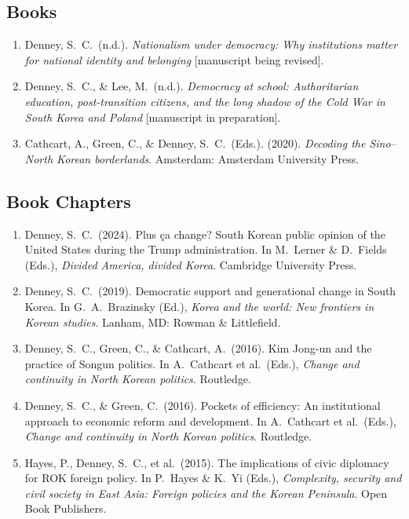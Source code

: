 \documentclass[11pt, a4paper]{article}
\begin{document}
\subsection{Books}

\begin{enumerate}[itemsep=0.15em]
  \item Denney, S.\ C.\ (n.d.). \textit{Nationalism under democracy: Why institutions matter for national identity and belonging} [manuscript being revised].

  \item Denney, S.\ C., \& Lee, M.\ (n.d.). \textit{Democracy at school: Authoritarian education, post-transition citizens, and the long shadow of the Cold War in South Korea and Poland} [manuscript in preparation].

  \item Cathcart, A., Green, C., \& Denney, S.\ C.\ (Eds.). (2020). \textit{Decoding the Sino--North Korean borderlands}. Amsterdam: Amsterdam University Press.
\end{enumerate}

\subsection{Book Chapters}

\begin{enumerate}[itemsep=0.15em]
  \item Denney, S.\ C.\ (2024). Plus \c{c}a change? South Korean public opinion of the United States during the Trump administration. In M.\ Lerner \& D.\ Fields (Eds.), \textit{Divided America, divided Korea}. Cambridge University Press.

  \item Denney, S.\ C.\ (2019). Democratic support and generational change in South Korea. In G.\ A.\ Brazinsky (Ed.), \textit{Korea and the world: New frontiers in Korean studies}. Lanham, MD: Rowman \& Littlefield.

  \item Denney, S.\ C., Green, C., \& Cathcart, A.\ (2016). Kim Jong-un and the practice of Songun politics. In A.\ Cathcart et al.\ (Eds.), \textit{Change and continuity in North Korean politics}. Routledge.

  \item Denney, S.\ C., \& Green, C.\ (2016). Pockets of efficiency: An institutional approach to economic reform and development. In A.\ Cathcart et al.\ (Eds.), \textit{Change and continuity in North Korean politics}. Routledge.

  \item Hayes, P., Denney, S.\ C., et al.\ (2015). The implications of civic diplomacy for ROK foreign policy. In P.\ Hayes \& K.\ Yi (Eds.), \textit{Complexity, security and civil society in East Asia: Foreign policies and the Korean Peninsula}. Open Book Publishers.
\end{enumerate}
\end{document}
